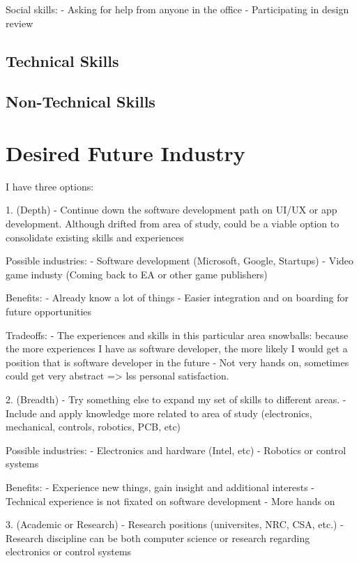 \documentclass[10pt,letterpaper]{article}
\begin{document}
Social skills:
- Asking for help from anyone in the office
- Participating in design review


\subsection{Technical Skills}

\subsection{Non-Technical Skills}

\section{Desired Future Industry}\label{desired-future-industry}


I have three options:

1. (Depth)
- Continue down the software development path on UI/UX or app development. Although drifted from area of study, could be a viable option to consolidate existing skills and experiences

Possible industries:
- Software development (Microsoft, Google, Startups)
- Video game industy (Coming back to EA or other game publishers)

Benefits:
- Already know a lot of things
- Easier integration and on boarding for future opportunities

Tradeoffs:
- The experiences and skills in this particular area snowballs: because the more experiences I have as software developer, the more likely I would get a position that is software developer in the future
- Not very hands on, sometimes could get very abstract => lss personal satisfaction.

2. (Breadth)
- Try something else to expand my set of skills to different areas.
- Include and apply knowledge more related to area of study (electronics, mechanical, controls, robotics, PCB, etc)

Possible industries:
- Electronics and hardware (Intel, etc)
- Robotics or control systems

Benefits:
- Experience new things, gain insight and additional interests
- Technical experience is not fixated on software development
- More hands on

3. (Academic or Research)
- Research positions (universites, NRC, CSA, etc.)
- Research discipline can be both computer science or research regarding electronics or control systems
\end{document}
